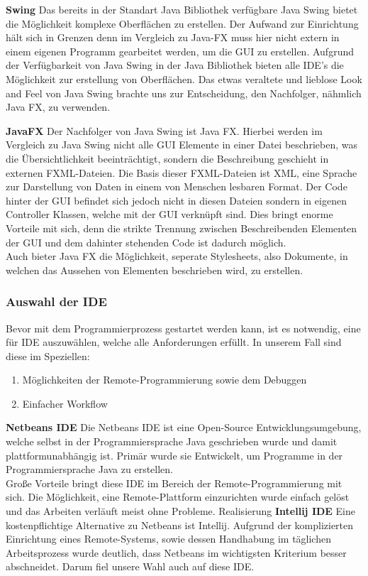 \textbf{Swing}
Das bereits in der Standart Java Bibliothek verfügbare Java Swing bietet die Möglichkeit komplexe Oberflächen zu erstellen. Der Aufwand zur Einrichtung hält sich in Grenzen denn im Vergleich zu Java-FX muss hier nicht extern in einem eigenen Programm gearbeitet werden, um die GUI zu erstellen.
Aufgrund der Verfügbarkeit von Java Swing in der Java Bibliothek bieten alle IDE's die Möglichkeit zur erstellung von Oberflächen. Das etwas veraltete und lieblose Look and Feel von Java Swing brachte uns zur Entscheidung, den Nachfolger, nähmlich Java FX, zu verwenden.

\textbf{JavaFX}
Der Nachfolger von Java Swing ist Java FX. Hierbei werden im Vergleich zu Java Swing nicht alle GUI Elemente in einer Datei beschrieben, was die Übersichtlichkeit beeinträchtigt, sondern die Beschreibung geschieht in externen FXML-Dateien.
Die Basis dieser FXML-Dateien ist XML, eine Sprache zur Darstellung von Daten in einem von Menschen lesbaren Format. Der Code hinter der GUI befindet sich jedoch nicht in diesen Dateien sondern in eigenen Controller Klassen, welche mit der GUI verknüpft sind. Dies bringt enorme Vorteile mit sich, denn die strikte Trennung zwischen Beschreibenden Elementen der GUI
und dem dahinter stehenden Code ist dadurch möglich.\\
Auch bieter Java FX die Möglichkeit, seperate Stylesheets, also Dokumente, in welchen das Aussehen von Elementen beschrieben wird, zu erstellen.


\subsubsection{Auswahl der IDE}
Bevor mit dem Programmierprozess gestartet werden kann, ist es notwendig, eine für IDE auszuwählen, welche alle Anforderungen erfüllt. In unserem Fall sind diese im Speziellen:
\begin{enumerate}
    \item Möglichkeiten der Remote-Programmierung sowie dem Debuggen
    \item Einfacher Workflow
\end{enumerate}

\textbf{Netbeans IDE}
Die Netbeans IDE ist eine Open-Source Entwicklungsumgebung, welche selbst in der Programmiersprache Java geschrieben wurde und damit plattformunabhängig ist. Primär wurde sie Entwickelt, um Programme in der Programmiersprache Java zu erstellen.\\
Große Vorteile bringt diese IDE im Bereich der Remote-Programmierung mit sich. Die Möglichkeit, eine Remote-Plattform einzurichten wurde einfach gelöst und das Arbeiten verläuft meist ohne Probleme.
Realisierung
\textbf{Intellij IDE}
Eine kostenpflichtige Alternative zu Netbeans ist Intellij. Aufgrund der komplizierten Einrichtung eines Remote-Systems, sowie dessen Handhabung im täglichen Arbeitsprozess wurde deutlich, dass Netbeans im wichtigsten Kriterium besser abschneidet. Darum fiel unsere Wahl auch auf diese IDE.

